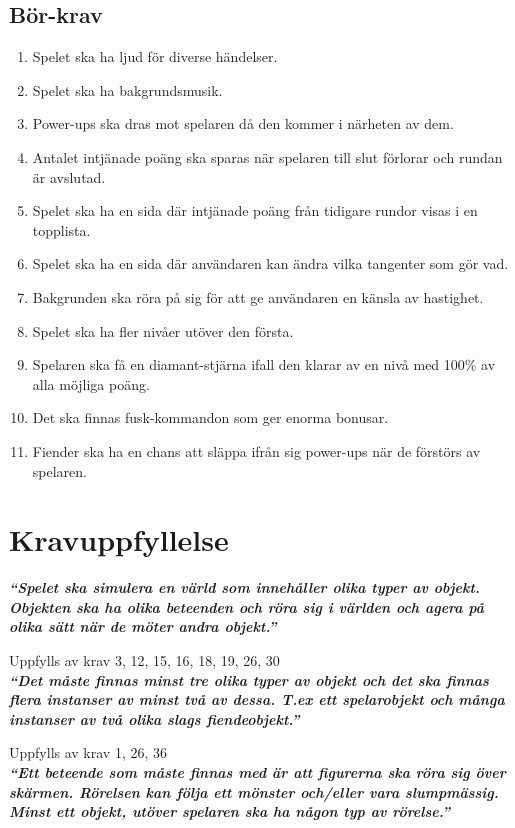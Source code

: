 \documentclass{TDP005mall}
\begin{document}
\subsection{Bör-krav}
\begin{enumerate}
\item Spelet ska ha ljud för diverse händelser.
\item Spelet ska ha bakgrundsmusik.
\item Power-ups ska dras mot spelaren då den kommer i närheten av dem.
\item Antalet intjänade poäng ska sparas när spelaren till slut förlorar och rundan är avslutad.
\item Spelet ska ha en sida där intjänade poäng från tidigare rundor visas i en topplista.
\item Spelet ska ha en sida där användaren kan ändra vilka tangenter som gör vad.
\item Bakgrunden ska röra på sig för att ge användaren en känsla av hastighet.
\item Spelet ska ha fler nivåer utöver den första.
\item Spelaren ska få en diamant-stjärna ifall den klarar av en nivå med 100\% av alla möjliga poäng.
\item Det ska finnas fusk-kommandon som ger enorma bonusar.
\item Fiender ska ha en chans att släppa ifrån sig power-ups när de förstörs av spelaren.

\end{enumerate}

\section{Kravuppfyllelse}
\textit{\textbf{``Spelet ska simulera en värld som innehåller olika typer av objekt. Objekten ska ha olika beteenden och röra sig i världen och agera på olika sätt när de möter andra objekt.''}}


Uppfylls av krav 3, 12, 15, 16, 18, 19, 26, 30\\


\textit{\textbf{``Det måste finnas minst tre olika typer av objekt och det ska finnas flera instanser av minst två av dessa. T.ex ett spelarobjekt och många instanser av två olika slags fiendeobjekt.''}}


Uppfylls av krav 1, 26, 36\\

\textit{\textbf{``Ett beteende som måste finnas med är att figurerna ska röra sig över skärmen. Rörelsen kan följa ett mönster och/eller vara slumpmässig. Minst ett objekt, utöver spelaren ska ha någon typ av rörelse.''}}
\end{document}
